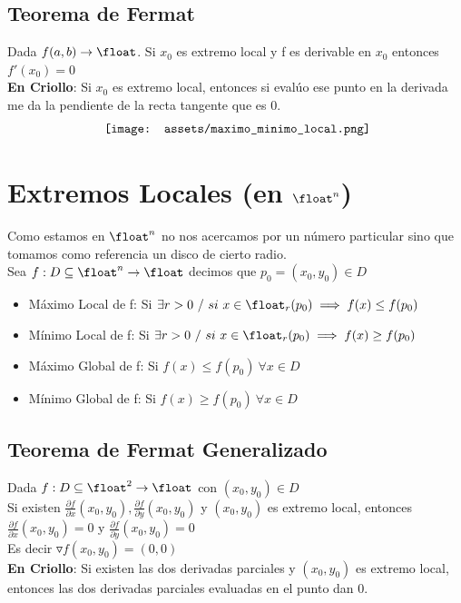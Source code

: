 \documentclass[10pt,a4paper]{article}
\begin{document}
\subsection*{Teorema de Fermat}
Dada $f(a,b) \rightarrow \float$. Si $x_{0}$ es extremo local y f es derivable en $x_{0}$ entonces $f'(x_{0}) = 0$ \\
\textbf{En Criollo}: Si $x_{0}$ es extremo local, entonces si evalúo ese punto en la derivada me da la pendiente de la recta tangente que es 0.
\[\begin{minipage}[b]{0.6\textwidth}
    \texttt{[image: assets/maximo\_minimo\_local.png]}
\end{minipage}\]
\section*{Extremos Locales (en $\float^{n}$)}
Como estamos en $\float^{n}$ no nos acercamos por un número particular sino que tomamos como referencia un disco de cierto radio. \\
Sea $f:D \subseteq \float^{n} \rightarrow \float$ decimos que $p_{0} = (x_{0},y_{0}) \in D$
\begin{itemize}
    \item Máximo Local de f: Si $\exists r > 0 \ / \ si \ x \in \float_{r}(p_{0}) \implies f(x) \le f(p_{0})$
    \item Mínimo Local de f: Si $\exists r > 0 \ / \ si \ x \in \float_{r}(p_{0}) \implies f(x) \ge f(p_{0})$
    \item Máximo Global de f: Si $f(x) \le f(p_{0}) \ \forall x \in D$
    \item Mínimo Global de f: Si $f(x) \ge f(p_{0}) \ \forall x \in D$
\end{itemize}
\subsection*{Teorema de Fermat Generalizado}
Dada $f:D \subseteq \float^{2} \rightarrow \float$ con $(x_{0}, y_{0}) \in D$ \\
Si existen $\frac{\partial f}{\partial x}(x_{0}, y_{0}), \frac{\partial f}{\partial y}(x_{0}, y_{0})$ y $(x_{0}, y_{0})$ es extremo local, entonces $\frac{\partial f}{\partial x}(x_{0}, y_{0}) = 0$ y $\frac{\partial f}{\partial y}(x_{0}, y_{0}) = 0$ \\
Es decir $\triangledown f(x_{0}, y_{0}) = (0,0)$ \\
\textbf{En Criollo}: Si existen las dos derivadas parciales y $(x_{0}, y_{0})$ es extremo local, entonces las dos derivadas parciales evaluadas en el punto dan 0.
\end{document}
